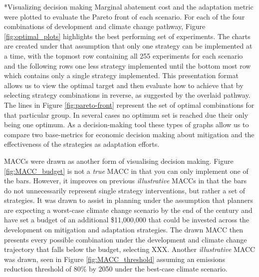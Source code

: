 \documentclass[twocolumn, a4paper,10pt]{article}
\makeatletter
\renewcommand\subsection{\@startsection{subsection}{1}{\z@}{\z@}{\z@}{\normalfont\normalsize\bfseries}}
\renewcommand\subsection{\@startsection{subsection}{1}{\z@}{\z@}{0.1pt}{\normalfont\normalsize\bfseries}}
\makeatother
\begin{document}
\subsection*{Visualizing decision making}
Marginal abatement cost and the adaptation metric were plotted to evaluate the Pareto front of each scenario. For each of the four combinations of development and climate change pathway, Figure \ref{fig:optimal_plots} highlights the best performing set of experiments. The charts are created under that assumption that only one strategy can be implemented at a time, with the topmost row containing all 255 experiments for each scenario and the following rows one less strategy implemented until the bottom most row which contains only a single strategy implemented. This presentation format allows us to view the optimal target and then evaluate how to achieve that by selecting strategy combinations in reverse, as suggested by the overlaid pathway. The lines in Figure \ref{fig:pareto-front} represent the set of optimal combinations for that particular group. In several cases no optimum set is reached due their only being one optimum. As a decision-making tool these types of graphs allow us to compare two base-metrics for economic decision making about mitigation and the effectiveness of the strategies as adaptation efforts.

MACCs were drawn as another form of visualising decision making. Figure \ref{fig:MACC_budget} is not a \textit{true} MACC in that you can only implement one of the bars. However, it improves on previous \textit{illustrative} MACCs in that the bars do not unnecessarily represent single strategy interventions, but rather a set of strategies. It was drawn to assist in planning under the assumption that planners are expecting a worst-case climate change scenario by the end of the century and have set a budget of an additional \$11,000,000 that could be invested across the development on mitigation and adaptation strategies. The drawn MACC then presents every possible combination under the development and climate change trajectory that falls below the budget, selecting XXX. Another \textit{illustrative} MACC was drawn, seen in Figure \ref{fig:MACC_threshold} assuming an emissions reduction threshold of 80\% by 2050 under the best-case climate scenario. 
\end{document}
